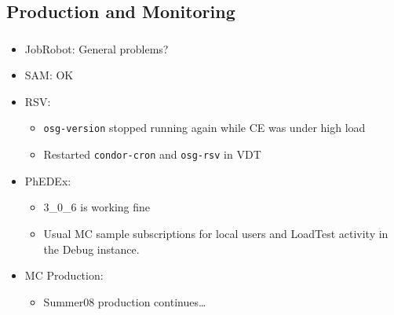 \documentclass{beamer}
\begin{document}
\subsection{Production and Monitoring}
\begin{frame}
\frametitle{}
\begin{itemize}
     \item JobRobot: General problems?
     \item SAM: OK
     \item RSV:
     \begin{itemize}
        \item {\tt osg-version} stopped running again while CE was under high load
        \item Restarted {\tt condor-cron} and {\tt osg-rsv} in VDT
     \end{itemize}
     \item PhEDEx:
     \begin{itemize}
        \item 3\_0\_6 is working fine
        \item Usual MC sample subscriptions for local users and LoadTest activity in the Debug instance.
     \end{itemize}
     \item MC Production:
     \begin{itemize}
        \item Summer08 production continues\ldots{}
     \end{itemize}
\end{itemize}
\end{frame}
\end{document}
